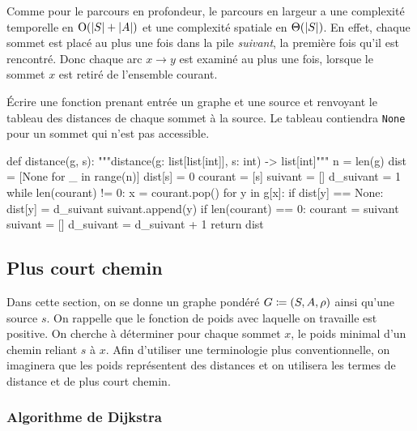 \documentclass{magnolia}
\begin{document}
Comme pour le parcours en profondeur, le parcours en largeur a une complexité temporelle
en ${\rm O}(\left|S\right|+\left|A\right|)$ et une complexité spatiale en $\Theta(\left|S\right|)$. 
En effet, chaque
sommet est placé au plus une fois dans la pile \emph{suivant}, la première fois qu'il est
rencontré.  Donc chaque arc
$x\to y$ est examiné au plus une fois, lorsque le sommet $x$ est retiré de l'ensemble
courant.
\vspace{2ex}
\begin{exoUnique}
\exo Écrire une fonction prenant entrée un graphe et une source et renvoyant le
  tableau des distances de chaque sommet à la source. Le tableau contiendra \verb!None!
  pour un sommet qui n'est pas accessible.
  \begin{sol}
\begin{pythoncodeline}
def distance(g, s):
    """distance(g: list[list[int]], s: int) -> list[int]"""
    n = len(g)
    dist = [None for _ in range(n)]
    dist[s] = 0
    courant = [s]
    suivant = []
    d_suivant = 1
    while len(courant) != 0:
        x = courant.pop()
        for y in g[x]:
            if dist[y] == None:
                dist[y] = d_suivant
                suivant.append(y)
        if len(courant) == 0:
            courant = suivant
            suivant = []
            d_suivant = d_suivant + 1
    return dist
\end{pythoncodeline}
  \end{sol}
\end{exoUnique}

\subsection{Plus court chemin}

Dans cette section, on se donne un graphe pondéré $G\coloneqq(S,A,\rho)$ ainsi qu'une source
$s$. On rappelle que le fonction de poids avec laquelle on travaille est positive.
On cherche à déterminer pour chaque sommet $x$, le poids minimal d'un chemin reliant $s$
à $x$. Afin d'utiliser une terminologie plus conventionnelle, on imaginera que les poids représentent des
distances et on utilisera les termes de distance et de plus court chemin.

\subsubsection{Algorithme de Dijkstra}
\end{document}
